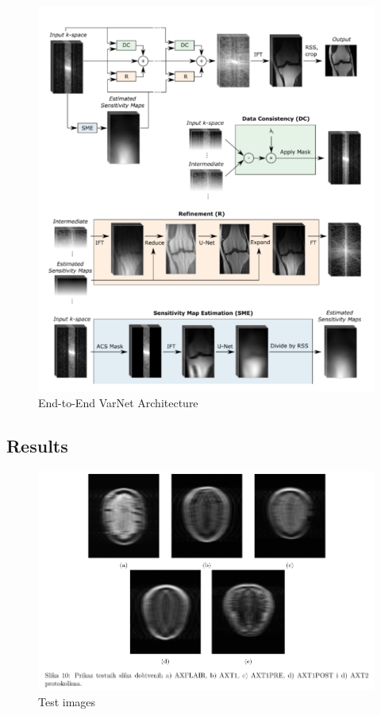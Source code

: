 \documentclass[10pt,a4paper]{article}
\begin{document}
\begin{figure}[H]
\centering
\includegraphics[scale=0.5]{images/e2e-varnet-architecture.png}
\caption{End-to-End VarNet Architecture}
\end{figure}

\subsection{Results}

\begin{figure}[H]
\centering
\includegraphics[width=400pt]{./images/test-images.png}
\caption{Test images}
\end{figure}
\end{document}

